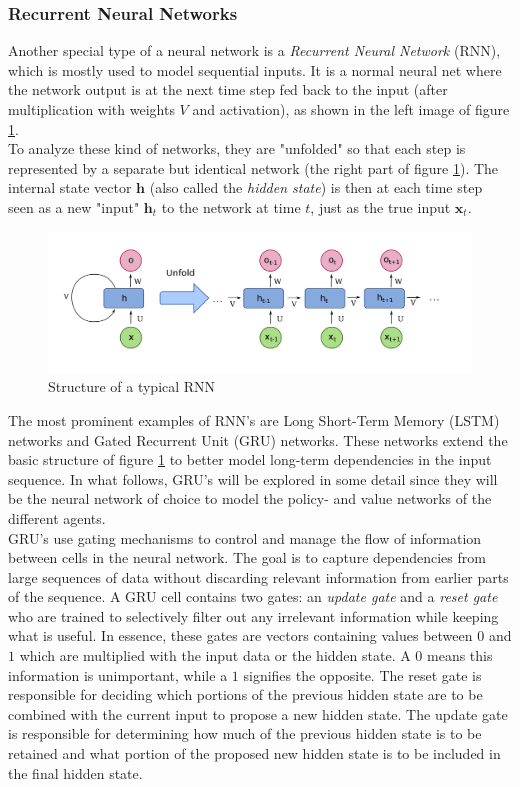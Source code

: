 \subsubsection{Recurrent Neural Networks}
Another special type of a neural network is a \emph{Recurrent Neural Network} (RNN), which is mostly used to model sequential inputs. It is a normal neural net where the network output is at the next time step fed back to the input (after multiplication with weights $V$ and activation), as shown in the left image of figure \ref{fig:rnn}.\\
To analyze these kind of networks, they are "unfolded" so that each step is represented by a separate but identical network (the right part of figure \ref{fig:rnn}). The internal state vector $\bm{h}$ (also called the \emph{hidden state}) is then at each time step seen as a new "input" $\bm{h}_t$ to the network at time $t$, just as the true input $\bm{x}_t$.\\
\begin{figure}[htp]
    \centering
    \includegraphics[width=14cm]{images/rnn.png}
    \caption{Structure of a typical RNN}
    \label{fig:rnn}
\end{figure}
The most prominent examples of RNN's are Long Short-Term Memory (LSTM) \cite{hochreiter1997long} networks and Gated Recurrent Unit (GRU) \cite{cho2014learning} networks. These networks extend the basic structure of figure \ref{fig:rnn} to better model long-term dependencies in the input sequence. In what follows, GRU's will be explored in some detail since they will be the neural network of choice to model the policy- and value networks of the different agents.\\
GRU's use gating mechanisms to control and manage the flow of information between cells in the neural network. The goal is to capture dependencies from large sequences of data without discarding relevant information from earlier parts of the sequence. A GRU cell contains two gates: an \emph{update gate} and a \emph{reset gate} who are trained to selectively filter out any irrelevant information while keeping what is useful. In essence, these gates are vectors containing values between $0$ and $1$ which are multiplied with the input data or the hidden state. A $0$ means this information is unimportant, while a $1$ signifies the opposite. The reset gate is responsible for deciding which portions of the previous hidden state are to be combined with the current input to propose a new hidden state. The update gate  is responsible for determining how much of the previous hidden state is to be retained and what portion of the proposed new hidden state is to be included in the final hidden state.\\
